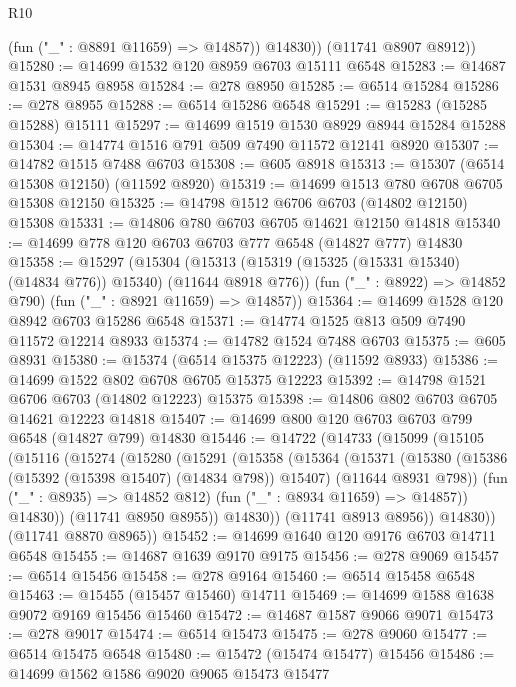 \begin{lexlean}{R10}
\begin{coremodule}
            (fun ("_" : @8891 @11659) => @14857))
          @14830))
      (@11741 @8907 @8912))
@15280 := @14699 @1532 @120 @8959 @6703 @15111 @6548
@15283 := @14687 @1531 @8945 @8958
@15284 := @278 @8950
@15285 := @6514 @15284
@15286 := @278 @8955
@15288 := @6514 @15286 @6548
@15291 := @15283 (@15285 @15288) @15111
@15297 := @14699 @1519 @1530 @8929 @8944 @15284 @15288
@15304 := @14774 @1516 @791 @509 @7490 @11572 @12141 @8920
@15307 := @14782 @1515 @7488 @6703
@15308 := @605 @8918
@15313 := @15307 (@6514 @15308 @12150) (@11592 @8920)
@15319 := @14699 @1513 @780 @6708 @6705 @15308 @12150
@15325 := @14798 @1512 @6706 @6703 (@14802 @12150) @15308
@15331 := @14806 @780 @6703 @6705 @14621 @12150 @14818
@15340 := @14699 @778 @120 @6703 @6703 @777 @6548 (@14827 @777) @14830
@15358 := @15297
    (@15304
      (@15313 (@15319 (@15325 (@15331 @15340) (@14834 @776)) @15340) (@11644 @8918 @776))
      (fun ("_" : @8922) => @14852 @790)
      (fun ("_" : @8921 @11659) => @14857))
@15364 := @14699 @1528 @120 @8942 @6703 @15286 @6548
@15371 := @14774 @1525 @813 @509 @7490 @11572 @12214 @8933
@15374 := @14782 @1524 @7488 @6703
@15375 := @605 @8931
@15380 := @15374 (@6514 @15375 @12223) (@11592 @8933)
@15386 := @14699 @1522 @802 @6708 @6705 @15375 @12223
@15392 := @14798 @1521 @6706 @6703 (@14802 @12223) @15375
@15398 := @14806 @802 @6703 @6705 @14621 @12223 @14818
@15407 := @14699 @800 @120 @6703 @6703 @799 @6548 (@14827 @799) @14830
@15446 := @14722
    (@14733
      (@15099
        (@15105
          (@15116
            (@15274
              (@15280
                (@15291
                  (@15358
                    (@15364
                      (@15371
                        (@15380
                          (@15386 (@15392 (@15398 @15407) (@14834 @798)) @15407)
                          (@11644 @8931 @798))
                        (fun ("_" : @8935) => @14852 @812)
                        (fun ("_" : @8934 @11659) => @14857))
                      @14830))
                  (@11741 @8950 @8955))
                @14830))
            (@11741 @8913 @8956))
          @14830))
      (@11741 @8870 @8965))
@15452 := @14699 @1640 @120 @9176 @6703 @14711 @6548
@15455 := @14687 @1639 @9170 @9175
@15456 := @278 @9069
@15457 := @6514 @15456
@15458 := @278 @9164
@15460 := @6514 @15458 @6548
@15463 := @15455 (@15457 @15460) @14711
@15469 := @14699 @1588 @1638 @9072 @9169 @15456 @15460
@15472 := @14687 @1587 @9066 @9071
@15473 := @278 @9017
@15474 := @6514 @15473
@15475 := @278 @9060
@15477 := @6514 @15475 @6548
@15480 := @15472 (@15474 @15477) @15456
@15486 := @14699 @1562 @1586 @9020 @9065 @15473 @15477

\end{coremodule}
\end{lexlean}
